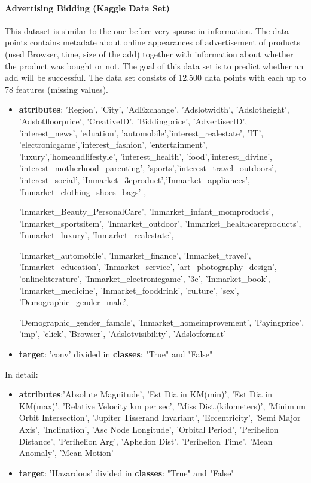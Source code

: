 \documentclass{article}
\begin{document}
\paragraph{Advertising Bidding (Kaggle Data Set)}
This dataset\cite{KaggleAdvertismentBidding} is similar to the one before very sparse in information. The data points contains metadate about online appearances of advertisement of products (used Browser, time, size of the add) together with information about whether the product was bought or not. The goal of this data set is to predict whether an add will be successful. The data set consists of 12.500 data points with each up to 78 features (missing values).


\begin{itemize}
	\item  \textbf{attributes}: 'Region', 'City', 'AdExchange', 'Adslotwidth', 'Adslotheight', 'Adslotfloorprice',
	'CreativeID', 'Biddingprice', 'AdvertiserID', 'interest\_news', 'eduation', 'automobile','interest\_realestate', 'IT', 'electronicgame','interest\_fashion', 'entertainment', 'luxury','homeandlifestyle', 'interest\_health', 'food','interest\_divine', 'interest\_motherhood\_parenting', 'sports','interest\_travel\_outdoors', 'interest\_social', 'Inmarket\_3cproduct','Inmarket\_appliances', 'Inmarket\_clothing\_shoes\_bags' ,

	'Inmarket\_Beauty\_PersonalCare', 'Inmarket\_infant\_momproducts',
	'Inmarket\_sportsitem', 'Inmarket\_outdoor', 'Inmarket\_healthcareproducts',
	'Inmarket\_luxury', 'Inmarket\_realestate',

	'Inmarket\_automobile',
	'Inmarket\_finance', 'Inmarket\_travel', 'Inmarket\_education',
	'Inmarket\_service', 'art\_photography\_design',
	'onlineliterature', 'Inmarket\_electronicgame', '3c',
	'Inmarket\_book', 'Inmarket\_medicine', 'Inmarket\_fooddrink',
	'culture', 'sex',
	'Demographic\_gender\_male',

	'Demographic\_gender\_famale', 'Inmarket\_homeimprovement', 'Payingprice',
	'imp', 'click', 'Browser', 'Adslotvisibility', 'Adslotformat' \\

	\item  \textbf{target}: 'conv' divided in \textbf{classes}: "True" and "False"
\end{itemize}

In detail:
\begin{itemize}
	\item  \textbf{attributes}:'Absolute Magnitude', 'Est Dia in KM(min)', 'Est Dia in KM(max)', 'Relative Velocity km per sec', 'Miss Dist.(kilometers)', 'Minimum Orbit Intersection', 'Jupiter Tisserand Invariant', 'Eccentricity', 'Semi Major Axis', 'Inclination', 'Asc Node Longitude', 'Orbital Period', 'Perihelion   Distance', 'Perihelion Arg', 'Aphelion Dist', 'Perihelion Time', 'Mean Anomaly', 'Mean Motion' \\

	\item  \textbf{target}: 'Hazardous' divided in \textbf{classes}: "True" and "False"
\end{itemize}
\end{document}
